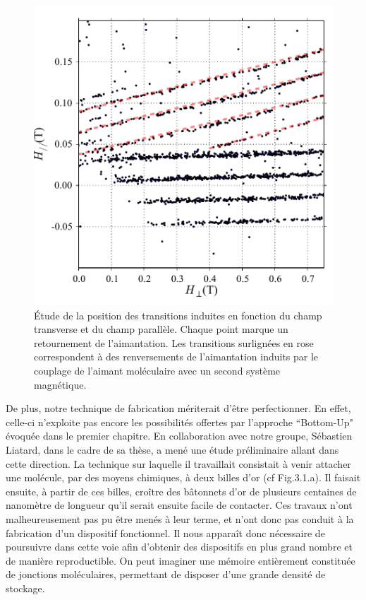 \begin{figure}[h!]
\parbox{7cm}{
\includegraphics[scale=0.45]{Conclusion/TranInd/TransInd.pdf} 
}
\parbox{6.5cm}{\caption{Étude de la position des transitions induites en fonction du champ transverse et du champ parallèle. Chaque point marque un retournement de l'aimantation. Les transitions surlignées en rose correspondent à des renversements de l'aimantation induits par le couplage de l'aimant moléculaire avec un second système magnétique.}
\label{TransIndConcl}
}
\end{figure}



De plus, notre technique de fabrication mériterait d'être perfectionner. En effet, celle-ci n'exploite pas encore les possibilités offertes par l'approche ``Bottom-Up" évoquée dans le premier chapitre. En collaboration avec notre groupe, Sébastien Liatard, dans le cadre de sa thèse, a mené une étude préliminaire allant dans cette direction. La technique sur laquelle il travaillait consistait à venir attacher une molécule, par des moyens chimiques, à deux billes d'or (cf Fig.3.1.a). Il faisait ensuite, à partir de ces billes, croître des bâtonnets d'or de plusieurs centaines de nanomètre de longueur qu'il serait ensuite facile de contacter. Ces travaux n'ont malheureusement pas pu être menés à leur terme, et n'ont donc pas conduit à la fabrication d'un dispositif fonctionnel. Il nous apparaît donc nécessaire de poursuivre dans cette voie afin d'obtenir des dispositifs en plus grand nombre et de manière reproductible. On peut imaginer une mémoire entièrement constituée de jonctions moléculaires, permettant de disposer d'une grande densité de stockage.




